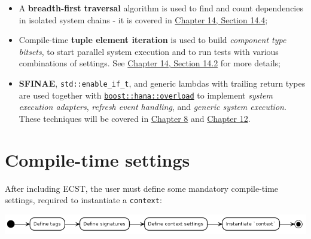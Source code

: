 \documentclass[twoside, 12pt, a4paper, openany]{book}
\let\origfigure=\figure
\let\endorigfigure=\endfigure
\renewenvironment{figure}[1][]{%
\origfigure[H]
}{%
\endorigfigure
}
\begin{document}
\begin{itemize}
\item
  A \textbf{breadth-first traversal} algorithm is used to find and count
  dependencies in isolated system chains - it is covered in
  \protect\hyperlink{appendix_compiletime_bfs}{Chapter 14, Section
  14.4};
\item
  Compile-time \textbf{tuple element iteration} is used to build
  \emph{component type bitsets}, to start parallel system execution and
  to run tests with various combinations of settings. See
  \protect\hyperlink{appendix_component_bitset_creation}{Chapter 14,
  Section 14.2} for more details;
\item
  \textbf{SFINAE},
  \texttt{std::enable_if_t},
  and generic lambdas with trailing return types are used together with
  \href{http://www.boost.org/doc/libs/1_61_0/libs/hana/doc/html/overload_8hpp.html}{\texttt{boost::hana::overload}}
  to implement \emph{system execution adapters}, \emph{refresh event
  handling}, and \emph{generic system execution}. These techniques will
  be covered in \protect\hyperlink{chap_flow}{Chapter 8} and
  \protect\hyperlink{chap_advfeats}{Chapter 12}.
\end{itemize}

\hypertarget{chap_ecst_compiletime}{\chapter{Compile-time
settings}\label{chap_ecst_compiletime}}

After including ECST, the user must define some mandatory compile-time
settings, required to instantiate a
\texttt{context}:

\begin{figure}[htbp]
\centering
\includegraphics{source/figures/generated/ecst/compiletime/options_activity.png}
\caption{ECST compile-time settings: mandatory options}
\end{figure}
\end{document}
